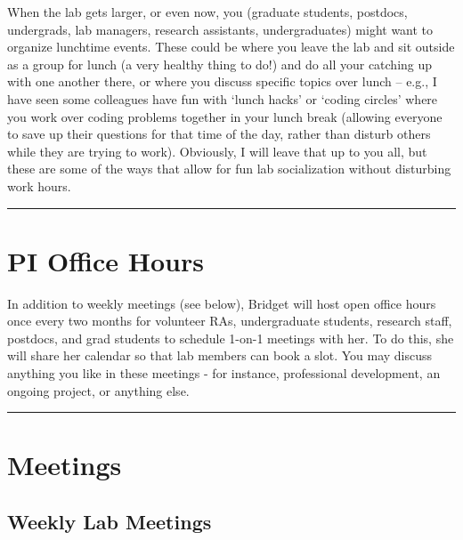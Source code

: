 \documentclass[]{book}
\begin{document}
When the lab gets larger, or even now, you (graduate students, postdocs, undergrads, lab managers, research assistants, undergraduates) might want to organize lunchtime events. These could be where you leave the lab and sit outside as a group for lunch (a very healthy thing to do!) and do all your catching up with one another there, or where you discuss specific topics over lunch -- e.g., I have seen some colleagues have fun with `lunch hacks' or `coding circles' where you work over coding problems together in your lunch break (allowing everyone to save up their questions for that time of the day, rather than disturb others while they are trying to work). Obviously, I will leave that up to you all, but these are some of the ways that allow for fun lab socialization without disturbing work hours.

\begin{center}\rule{0.5\linewidth}{0.5pt}\end{center}

\hypertarget{pi-office-hours}{%
\section{PI Office Hours}\label{pi-office-hours}}

In addition to weekly meetings (see below), Bridget will host open office hours once every two months for volunteer RAs, undergraduate students, research staff, postdocs, and grad students to schedule 1-on-1 meetings with her. To do this, she will share her calendar so that lab members can book a slot. You may discuss anything you like in these meetings - for instance, professional development, an ongoing project, or anything else.

\begin{center}\rule{0.5\linewidth}{0.5pt}\end{center}

\hypertarget{meetings}{%
\section{Meetings}\label{meetings}}

\hypertarget{weekly-lab-meetings}{%
\subsection{Weekly Lab Meetings}\label{weekly-lab-meetings}}
\end{document}
